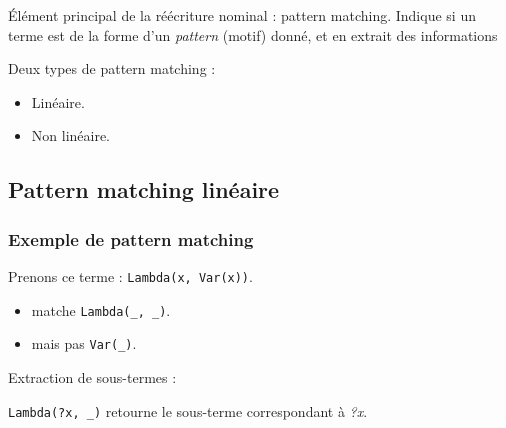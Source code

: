 
\begin{frame}

\'Elément principal de la réécriture nominal : pattern matching. Indique si un
terme est de la forme d'un \emph{pattern} (motif) donné, et en extrait des informations

\bigskip

Deux types de pattern matching : 
\begin{itemize}
\item Linéaire. 
\item Non linéaire. 
\end{itemize}

\end{frame}

\subsection{Pattern matching linéaire}


\begin{frame}
\frametitle{Exemple de pattern matching}

Prenons ce terme :
\texttt{Lambda(x, Var(x))}. 
\begin{itemize} 

  \item matche \texttt{Lambda(\_, \_)}.
  \item mais pas \texttt{Var(\_)}.

\end{itemize}

\bigskip

Extraction de sous-termes :

\texttt{Lambda(?x, \_)} retourne le sous-terme correspondant à \emph{?x}.

\end{frame}

